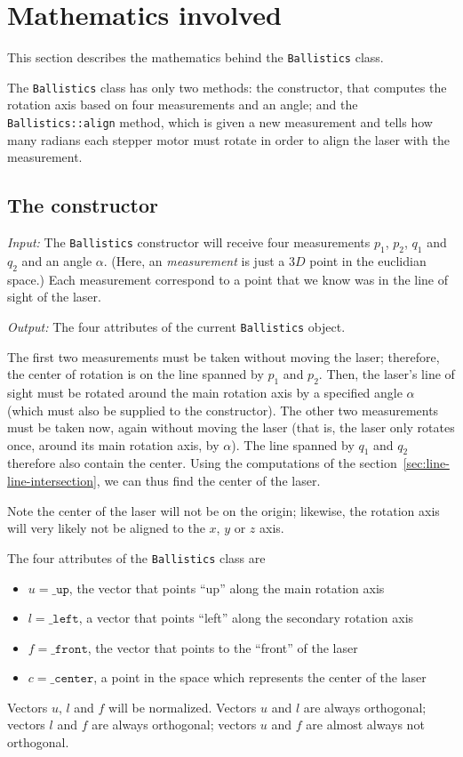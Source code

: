 \documentclass{article}
\newcommand\class[1]{\texttt{#1}}
\newcommand\method[1]{\texttt{#1}}
\newcommand\attribute[1]{\texttt{#1}}
\begin{document}
\section{Mathematics involved}
\label{sec:math}

This section describes the mathematics behind the \class{Ballistics} class.

The \class{Ballistics} class has only two methods: the constructor,
that computes the rotation axis based on four measurements and an angle;
and the \method{Ballistics::align} method,
which is given a new measurement and tells how many radians
each stepper motor must rotate in order to align the laser with the measurement.

\subsection{The constructor}

\emph{Input:}
The \class{Ballistics} constructor will receive four measurements
$p_1$, $p_2$, $q_1$ and $q_2$ and an angle $\alpha$.
(Here, an \emph{measurement} is just a $3D$ point in the euclidian space.)
Each measurement correspond to a point
that we know was in the line of sight of the laser.

\noindent \emph{Output:}
The four attributes of the current \class{Ballistics} object.

The first two measurements must be taken without moving the laser;
therefore, the center of rotation is on the line spanned by $p_1$ and $p_2$.
Then, the laser's line of sight must be rotated around the main rotation axis
by a specified angle $\alpha$ (which must also be supplied to the constructor).
The other two measurements must be taken now, again without moving the laser
(that is, the laser only rotates once, around its main rotation axis, by $\alpha$).
The line spanned by $q_1$ and $q_2$ therefore also contain the center.
Using the computations of the section~\ref{sec:line-line-intersection},
we can thus find the center of the laser.

Note the center of the laser will not be on the origin;
likewise, the rotation axis will very likely not be aligned to
the $x$, $y$ or $z$ axis.

The four attributes of the \class{Ballistics} class are
\begin{itemize}
    \item $u = \attribute{\_up}$,
        the vector that points ``up'' along the main rotation axis
    \item $l = \attribute{\_left}$,
        a vector that points ``left'' along the secondary rotation axis
    \item $f = \attribute{\_front}$,
        the vector that points to the ``front'' of the laser
    \item $c = \attribute{\_center}$,
        a point in the space which represents the center of the laser
\end{itemize}
Vectors $u$, $l$ and $f$ will be normalized.
Vectors $u$ and $l$ are always orthogonal;
vectors $l$ and $f$ are always orthogonal;
vectors $u$ and $f$ are almost always not orthogonal.
\end{document}
